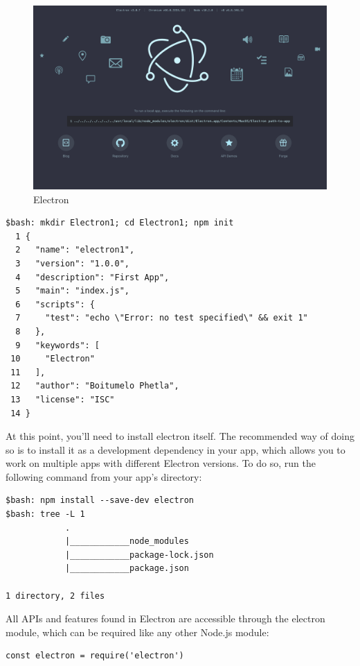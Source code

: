 \documentclass[10pt, a4paper, twocolumn]{article}
\begin{document}
\begin{figure}[h!]
	\includegraphics[width=\linewidth]{electron.png} %
	\caption{Electron} %
	\label{elec} %
\end{figure}

\begin{lstlisting}
$bash: mkdir Electron1; cd Electron1; npm init
  1 {
  2   "name": "electron1",
  3   "version": "1.0.0",
  4   "description": "First App",
  5   "main": "index.js",
  6   "scripts": {
  7     "test": "echo \"Error: no test specified\" && exit 1"
  8   },
  9   "keywords": [
 10     "Electron"
 11   ],
 12   "author": "Boitumelo Phetla",
 13   "license": "ISC"
 14 }
\end{lstlisting}

At this point, you'll need to install electron itself. The recommended way of doing so is to install it as a development dependency in your app, which allows you to work on multiple apps with different Electron versions. To do so, run the following command from your app's directory:

\begin{lstlisting}
$bash: npm install --save-dev electron
$bash: tree -L 1
			.
			|____________node_modules
			|____________package-lock.json
			|____________package.json

1 directory, 2 files
\end{lstlisting}

All APIs and features found in Electron are accessible through the electron module, which can be required like any other Node.js module:

\begin{lstlisting}
const electron = require('electron')
\end{lstlisting}
\end{document}
